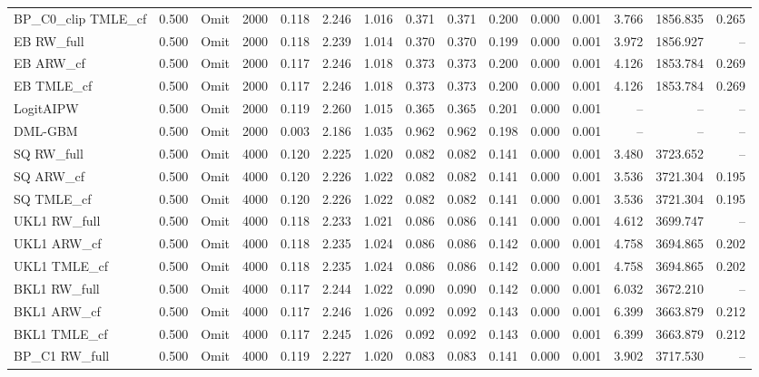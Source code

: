 \begin{tabular}{llllrrrrrrrrrrr}
BP\_C0\_clip TMLE\_cf & 0.500 & Omit & 2000 & 0.118 & 2.246 & 1.016 & 0.371 & 0.371 & 0.200 & 0.000 & 0.001 & 3.766 & 1856.835 & 0.265 \\
EB RW\_full & 0.500 & Omit & 2000 & 0.118 & 2.239 & 1.014 & 0.370 & 0.370 & 0.199 & 0.000 & 0.001 & 3.972 & 1856.927 & -- \\
EB ARW\_cf & 0.500 & Omit & 2000 & 0.117 & 2.246 & 1.018 & 0.373 & 0.373 & 0.200 & 0.000 & 0.001 & 4.126 & 1853.784 & 0.269 \\
EB TMLE\_cf & 0.500 & Omit & 2000 & 0.117 & 2.246 & 1.018 & 0.373 & 0.373 & 0.200 & 0.000 & 0.001 & 4.126 & 1853.784 & 0.269 \\
LogitAIPW & 0.500 & Omit & 2000 & 0.119 & 2.260 & 1.015 & 0.365 & 0.365 & 0.201 & 0.000 & 0.001 & -- & -- & -- \\
DML-GBM & 0.500 & Omit & 2000 & 0.003 & 2.186 & 1.035 & 0.962 & 0.962 & 0.198 & 0.000 & 0.001 & -- & -- & -- \\
SQ RW\_full & 0.500 & Omit & 4000 & 0.120 & 2.225 & 1.020 & 0.082 & 0.082 & 0.141 & 0.000 & 0.001 & 3.480 & 3723.652 & -- \\
SQ ARW\_cf & 0.500 & Omit & 4000 & 0.120 & 2.226 & 1.022 & 0.082 & 0.082 & 0.141 & 0.000 & 0.001 & 3.536 & 3721.304 & 0.195 \\
SQ TMLE\_cf & 0.500 & Omit & 4000 & 0.120 & 2.226 & 1.022 & 0.082 & 0.082 & 0.141 & 0.000 & 0.001 & 3.536 & 3721.304 & 0.195 \\
UKL1 RW\_full & 0.500 & Omit & 4000 & 0.118 & 2.233 & 1.021 & 0.086 & 0.086 & 0.141 & 0.000 & 0.001 & 4.612 & 3699.747 & -- \\
UKL1 ARW\_cf & 0.500 & Omit & 4000 & 0.118 & 2.235 & 1.024 & 0.086 & 0.086 & 0.142 & 0.000 & 0.001 & 4.758 & 3694.865 & 0.202 \\
UKL1 TMLE\_cf & 0.500 & Omit & 4000 & 0.118 & 2.235 & 1.024 & 0.086 & 0.086 & 0.142 & 0.000 & 0.001 & 4.758 & 3694.865 & 0.202 \\
BKL1 RW\_full & 0.500 & Omit & 4000 & 0.117 & 2.244 & 1.022 & 0.090 & 0.090 & 0.142 & 0.000 & 0.001 & 6.032 & 3672.210 & -- \\
BKL1 ARW\_cf & 0.500 & Omit & 4000 & 0.117 & 2.246 & 1.026 & 0.092 & 0.092 & 0.143 & 0.000 & 0.001 & 6.399 & 3663.879 & 0.212 \\
BKL1 TMLE\_cf & 0.500 & Omit & 4000 & 0.117 & 2.245 & 1.026 & 0.092 & 0.092 & 0.143 & 0.000 & 0.001 & 6.399 & 3663.879 & 0.212 \\
BP\_C1 RW\_full & 0.500 & Omit & 4000 & 0.119 & 2.227 & 1.020 & 0.083 & 0.083 & 0.141 & 0.000 & 0.001 & 3.902 & 3717.530 & -- \\

\end{tabular}
